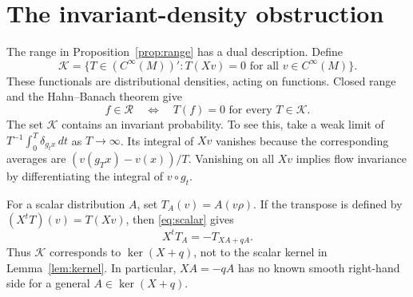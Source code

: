 \documentclass[11pt]{article}
\theoremstyle{definition}
\theoremstyle{remark}
\newcommand{\calR}{\mathcal R}
\newcommand{\calK}{\mathcal K}
\begin{document}
\section{The invariant-density obstruction}
\label{sec:density}

The range in Proposition~\ref{prop:range} has a dual description. Define
\[
 \calK=\{T\in(C^\infty(M))':T(Xv)=0\text{ for all }v\in C^\infty(M)\}.
\]
These functionals are distributional densities, acting on functions. Closed range and the Hahn--Banach theorem give
\begin{equation}\label{eq:annihilator}
 f\in\calR\quad\Longleftrightarrow\quad T(f)=0\text{ for every }T\in\calK.
\end{equation}
The set $\calK$ contains an invariant probability. To see this, take a weak limit of $T^{-1}\int_0^T\delta_{g_t x}\,dt$ as $T\to\infty$. Its integral of $Xv$ vanishes because the corresponding averages are $(v(g_Tx)-v(x))/T$. Vanishing on all $Xv$ implies flow invariance by differentiating the integral of $v\circ g_t$.

For a scalar distribution $A$, set $T_A(v)=A(v\rho)$. If the transpose is defined by $(X^tT)(v)=T(Xv)$, then \eqref{eq:scalar} gives
\begin{equation}\label{eq:transpose}
 X^tT_A=-T_{XA+qA}.
\end{equation}
Thus $\calK$ corresponds to $\ker(X+q)$, not to the scalar kernel in Lemma~\ref{lem:kernel}. In particular, $XA=-qA$ has no known smooth right-hand side for a general $A\in\ker(X+q)$.
\end{document}
